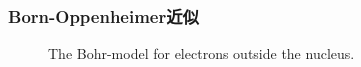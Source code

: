 \documentclass[cjk,slidestop,handout,compress,mathserif,blue]{beamer}	%
\begin{document}

\subject{TEST-2}
\frame
{
\titlepage
}
\author{北京市计算中心\;云平台\:姜骏}
\date{\textrm{2016.08.22}}
\frame{\titlepage}

\section*{}

\small
\frame
{
	\frametitle{Born-Oppenheimer近似}
\begin{figure}[h!]
\centering
	\caption{\textrm{The Bohr-model for electrons outside the nucleus.}}
\label{Bohr-model}
\end{figure}
}
\end{document}
